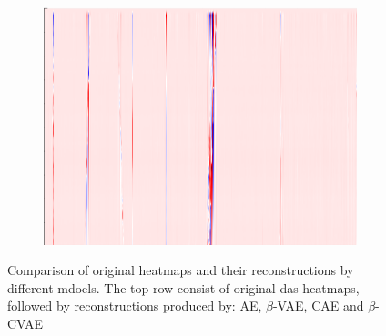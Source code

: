 \begin{figure}[!h]
\begin{subfigure}{0.33\textwidth}
        \includegraphics[width=\textwidth]{figures/test.png}
    \end{subfigure}
    
    \caption{Comparison of original heatmaps and their reconstructions by different mdoels. The top row consist of original \acrshort{das} heatmaps, followed by reconstructions produced by: AE, $\beta$-VAE, CAE and $\beta$-CVAE}
    \label{fig:aereconstruct}
\end{figure}
